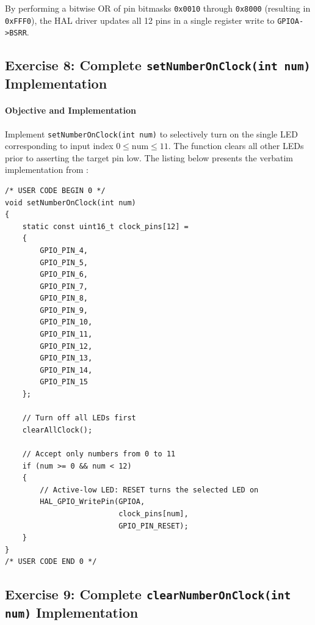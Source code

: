 \documentclass[oneside,final]{hcmut-report}
\begin{document}
\noindent By performing a bitwise OR of pin bitmasks \texttt{0x0010} through \texttt{0x8000} (resulting in \texttt{0xFFF0}), the HAL driver updates all 12 pins in a single register write to \texttt{GPIOA->BSRR}.

\vspace{-0.4em}
\subsection{Exercise 8: Complete \texttt{setNumberOnClock(int num)} Implementation}
\label{subsec:ex8}
\paragraph{Objective and Implementation}
Implement \texttt{setNumberOnClock(int num)} to selectively turn on the single LED corresponding to input index $0 \le \text{num} \le 11$. The function clears all other LEDs prior to asserting the target pin low. The listing below presents the verbatim implementation from :

\begin{lstlisting}[caption={[setNumberOnClock() function]{Complete setNumberOnClock(int num) implementation (Lab1\_e8/Core/Src/main.c)}},label={lst:ex8_func},basicstyle=\fontsize{6.6pt}{7.3pt}\ttfamily,lineskip=0pt,aboveskip=0pt,belowskip=0pt]
/* USER CODE BEGIN 0 */
void setNumberOnClock(int num)
{
    static const uint16_t clock_pins[12] =
    {
        GPIO_PIN_4,
        GPIO_PIN_5,
        GPIO_PIN_6,
        GPIO_PIN_7,
        GPIO_PIN_8,
        GPIO_PIN_9,
        GPIO_PIN_10,
        GPIO_PIN_11,
        GPIO_PIN_12,
        GPIO_PIN_13,
        GPIO_PIN_14,
        GPIO_PIN_15
    };

    // Turn off all LEDs first
    clearAllClock();

    // Accept only numbers from 0 to 11
    if (num >= 0 && num < 12)
    {
        // Active-low LED: RESET turns the selected LED on
        HAL_GPIO_WritePin(GPIOA,
                          clock_pins[num],
                          GPIO_PIN_RESET);
    }
}
/* USER CODE END 0 */
\end{lstlisting}

\subsection{Exercise 9: Complete \texttt{clearNumberOnClock(int num)} Implementation}
\label{subsec:ex9}
\end{document}
